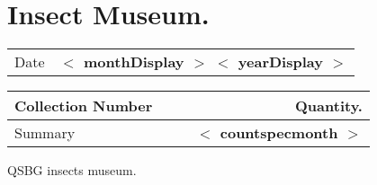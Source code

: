 \documentclass{article}
\newcommand{\placeholder}[1]{\textbf{$<$ #1 $>$}}
\newcommand{\countspecmonth}{\placeholder{countspecmonth}}
\newcommand{\monthDisplay}{\placeholder{monthDisplay}}
\newcommand{\yearDisplay}{\placeholder{yearDisplay}}
\begin{document}
\section*{Insect Museum.}

	\begin{tabular}{l l}
		Date	& \monthDisplay{} \yearDisplay{} \\
	\end{tabular}

	\vspace{15mm}
	\begin{tabularx}{\textwidth}{X r r | r}

	\textbf{Collection Number} &  &  & \textbf{Quantity.}\\

	\hline

	\hline
	Summary & & & \countspecmonth{} \\
	\end{tabularx}
	
	\vfill
	QSBG insects museum.
	
\end{document}
